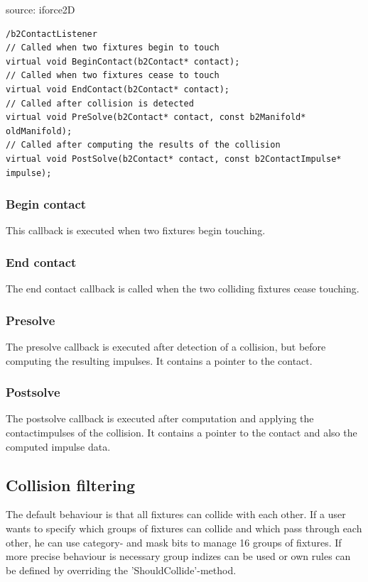 \documentclass[10pt,a4paper,DIV=11]{scrreprt}
\begin{document}
source: iforce2D


\begin{lstlisting}[caption={Contact listener methods},label=lst:collision-contact]
/b2ContactListener
// Called when two fixtures begin to touch
virtual void BeginContact(b2Contact* contact);
// Called when two fixtures cease to touch
virtual void EndContact(b2Contact* contact);
// Called after collision is detected
virtual void PreSolve(b2Contact* contact, const b2Manifold* oldManifold);
// Called after computing the results of the collision
virtual void PostSolve(b2Contact* contact, const b2ContactImpulse* impulse);
\end{lstlisting}

\subsubsection*{Begin contact}
This callback is executed when two fixtures begin touching.

\subsubsection*{End contact}
The end contact callback is called when the two colliding fixtures cease touching.

\subsubsection*{Presolve}
The presolve callback is executed after detection of a collision, but before computing the resulting impulses. It contains a pointer to the contact.

\subsubsection*{Postsolve}
The postsolve callback is executed after computation and applying the contactimpulses of the collision. It contains a pointer to the contact and also the computed impulse data.

\subsection{Collision filtering}
The default behaviour is that all fixtures can collide with each other. If a user wants to specify which groups of fixtures can collide and which pass through each other, he can use category- and mask bits to manage 16 groups of fixtures. If more precise behaviour is necessary group indizes can be used or own rules can be defined by overriding the 'ShouldCollide'-method.
\end{document}
